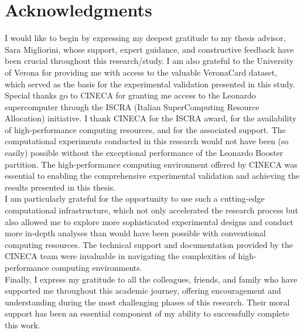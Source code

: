 \documentclass[12pt,a4paper]{article}
\begin{document}
\section{Acknowledgments}

I would like to begin by expressing my deepest gratitude to my thesis advisor, Sara Migliorini, whose support, expert guidance, and constructive feedback have been crucial throughout this research/study. I am also grateful to the University of Verona for providing me with access to the valuable VeronaCard dataset, which served as the basis for the experimental validation presented in this study.\\

Special thanks go to CINECA for granting me access to the Leonardo supercomputer through the ISCRA (Italian SuperComputing Resource Allocation) initiative. I thank CINECA for the ISCRA award, for the availability of high-performance computing resources, and for the associated support. The computational experiments conducted in this research would not have been (so easily) possible without the exceptional performance of the Leonardo Booster partition. The high-performance computing environment offered by CINECA was essential to enabling the comprehensive experimental validation and achieving the results presented in this thesis.\\

I am particularly grateful for the opportunity to use such a cutting-edge computational infrastructure, which not only accelerated the research process but also allowed me to explore more sophisticated experimental designs and conduct more in-depth analyses than would have been possible with conventional computing resources. The technical support and documentation provided by the CINECA team were invaluable in navigating the complexities of high-performance computing environments.\\

Finally, I express my gratitude to all the colleagues, friends, and family who have supported me throughout this academic journey, offering encouragement and understanding during the most challenging phases of this research. Their moral support has been an essential component of my ability to successfully complete this work.\\



\end{document}
